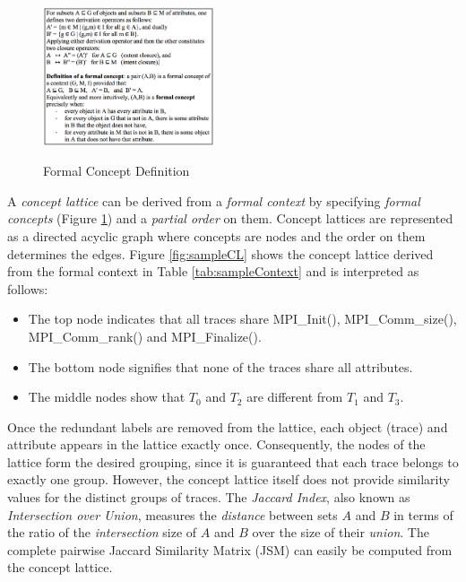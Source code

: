 \begin{figure}[]
\centering
\caption{Formal Concept Definition}
\includegraphics[width=0.45\textwidth]{figs/formalConceptDefinition.png}
\label{fig:formalConceptDefinition}
\end{figure}

A \textit{concept lattice} can be derived from a \textit{formal context} by specifying \textit{formal concepts} (Figure \ref{fig:formalConceptDefinition}) and a \textit{partial order} on them. Concept lattices are represented as a directed acyclic graph where concepts are nodes and the order on them determines the edges.
%
Figure \ref{fig:sampleCL} shows the concept lattice derived from the formal context in Table \ref{tab:sampleContext} and is interpreted as follows:

\begin{itemize}
    \item The top node indicates that all traces share MPI\_Init(), MPI\_Comm\_size(), MPI\_Comm\_rank() and MPI\_Finalize().
    \item The bottom node signifies that none of the traces share all attributes. 
    \item The middle nodes show that $T_0$ and $T_2$ are different from  $T_1$ and $T_3$.
\end{itemize}




Once the redundant labels are removed from the lattice, each object (trace) and attribute appears in the lattice exactly once. Consequently, the nodes of the lattice form the desired grouping, since it is guaranteed that each trace belongs to exactly one group. However, the concept lattice itself does not provide similarity values for the distinct groups of traces. The \textit{Jaccard Index}, also known as \textit{Intersection over Union}, measures the \textit{distance} between sets $A$ and $B$ in terms of the ratio of the \textit{intersection} size of $A$ and $B$ over the size of their \textit{union}.  The complete pairwise Jaccard Similarity Matrix (JSM) can easily be computed from the concept lattice.
%



